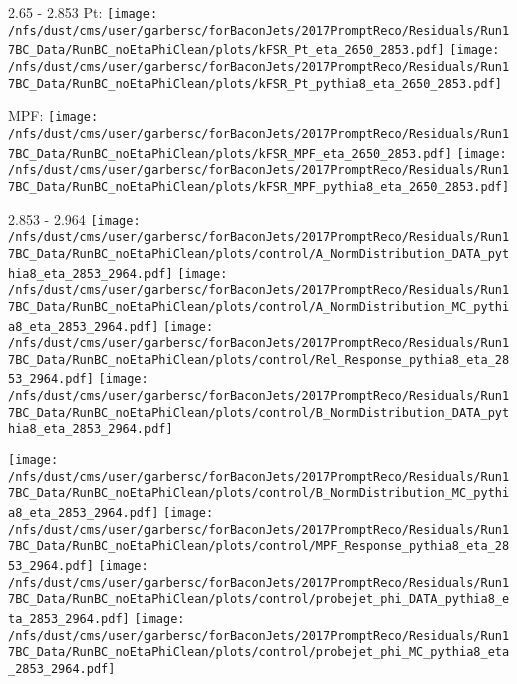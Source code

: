 \documentclass[t,compress]{beamer}
\begin{document}
\begin{frame}{2.65 - 2.853}
	 Pt: \texttt{[image: /nfs/dust/cms/user/garbersc/forBaconJets/2017PromptReco/Residuals/Run17BC\_Data/RunBC\_noEtaPhiClean/plots/kFSR\_Pt\_eta\_2650\_2853.pdf]}
	\texttt{[image: /nfs/dust/cms/user/garbersc/forBaconJets/2017PromptReco/Residuals/Run17BC\_Data/RunBC\_noEtaPhiClean/plots/kFSR\_Pt\_pythia8\_eta\_2650\_2853.pdf]}
\newline

	 MPF: \texttt{[image: /nfs/dust/cms/user/garbersc/forBaconJets/2017PromptReco/Residuals/Run17BC\_Data/RunBC\_noEtaPhiClean/plots/kFSR\_MPF\_eta\_2650\_2853.pdf]}
	\texttt{[image: /nfs/dust/cms/user/garbersc/forBaconJets/2017PromptReco/Residuals/Run17BC\_Data/RunBC\_noEtaPhiClean/plots/kFSR\_MPF\_pythia8\_eta\_2650\_2853.pdf]}
\end{frame}

\begin{frame}{2.853 - 2.964}
	\texttt{[image: /nfs/dust/cms/user/garbersc/forBaconJets/2017PromptReco/Residuals/Run17BC\_Data/RunBC\_noEtaPhiClean/plots/control/A\_NormDistribution\_DATA\_pythia8\_eta\_2853\_2964.pdf]}
	\texttt{[image: /nfs/dust/cms/user/garbersc/forBaconJets/2017PromptReco/Residuals/Run17BC\_Data/RunBC\_noEtaPhiClean/plots/control/A\_NormDistribution\_MC\_pythia8\_eta\_2853\_2964.pdf]}
	\texttt{[image: /nfs/dust/cms/user/garbersc/forBaconJets/2017PromptReco/Residuals/Run17BC\_Data/RunBC\_noEtaPhiClean/plots/control/Rel\_Response\_pythia8\_eta\_2853\_2964.pdf]}
	\texttt{[image: /nfs/dust/cms/user/garbersc/forBaconJets/2017PromptReco/Residuals/Run17BC\_Data/RunBC\_noEtaPhiClean/plots/control/B\_NormDistribution\_DATA\_pythia8\_eta\_2853\_2964.pdf]}
\newline

	\texttt{[image: /nfs/dust/cms/user/garbersc/forBaconJets/2017PromptReco/Residuals/Run17BC\_Data/RunBC\_noEtaPhiClean/plots/control/B\_NormDistribution\_MC\_pythia8\_eta\_2853\_2964.pdf]}
	\texttt{[image: /nfs/dust/cms/user/garbersc/forBaconJets/2017PromptReco/Residuals/Run17BC\_Data/RunBC\_noEtaPhiClean/plots/control/MPF\_Response\_pythia8\_eta\_2853\_2964.pdf]}
	\texttt{[image: /nfs/dust/cms/user/garbersc/forBaconJets/2017PromptReco/Residuals/Run17BC\_Data/RunBC\_noEtaPhiClean/plots/control/probejet\_phi\_DATA\_pythia8\_eta\_2853\_2964.pdf]}
	\texttt{[image: /nfs/dust/cms/user/garbersc/forBaconJets/2017PromptReco/Residuals/Run17BC\_Data/RunBC\_noEtaPhiClean/plots/control/probejet\_phi\_MC\_pythia8\_eta\_2853\_2964.pdf]}
\end{frame}
\end{document}
